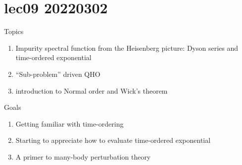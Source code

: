 \chapter{lec09 20220302}

Topics

\begin{enumerate}
    \item Impurity spectral function from the Heisenberg picture: Dyson series and time-ordered exponential
    \item ``Sub-problem'' driven QHO
    \item introduction to Normal order and Wick's theorem
\end{enumerate}

Goals

\begin{enumerate}
    \item Getting familiar with time-ordering
    \item Starting to appreciate how to evaluate time-ordered exponential
    \item A primer to many-body perturbation theory
\end{enumerate}

